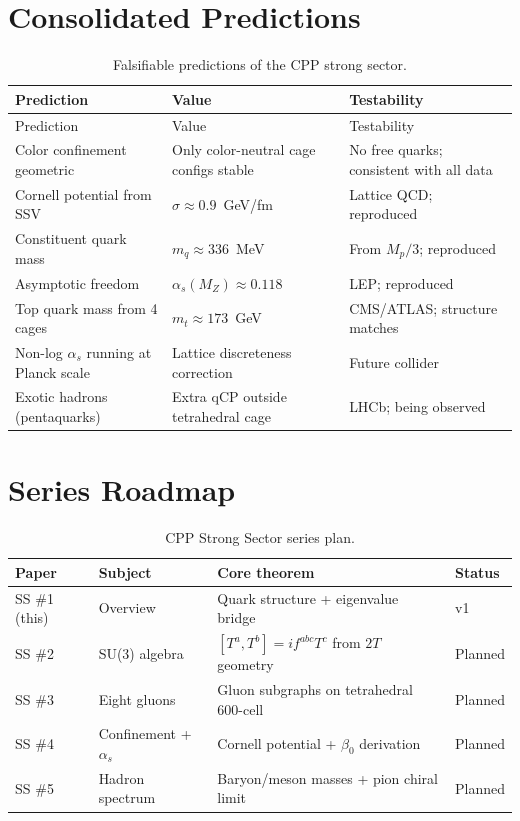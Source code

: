 \documentclass[11pt,a4paper]{article}
\newcommand{\as}{\alpha_s}
\begin{document}
\section{Consolidated Predictions}

\begin{longtable}{@{}p{4.5cm}p{4cm}p{4cm}@{}}
\caption{Falsifiable predictions of the CPP strong sector.}
\label{tab:predictions}\\
\toprule
Prediction & Value & Testability \\
\midrule
\endfirsthead
\toprule
Prediction & Value & Testability \\
\midrule
\endhead
\bottomrule
\endfoot
Color confinement geometric
  & Only color-neutral cage configs stable
  & No free quarks; consistent with all data \\[4pt]
Cornell potential from SSV
  & $\sigma \approx 0.9$~GeV/fm
  & Lattice QCD; reproduced \\[4pt]
Constituent quark mass
  & $m_q \approx 336$~MeV
  & From $M_p/3$; reproduced \\[4pt]
Asymptotic freedom
  & $\as(M_Z) \approx 0.118$
  & LEP; reproduced \\[4pt]
Top quark mass from 4 cages
  & $m_t \approx 173$~GeV
  & CMS/ATLAS; structure matches \\[4pt]
Non-log $\as$ running at Planck scale
  & Lattice discreteness correction
  & Future collider \\[4pt]
Exotic hadrons (pentaquarks)
  & Extra qCP outside tetrahedral cage
  & LHCb; being observed \\
\end{longtable}

\section{Series Roadmap}

\begin{table}[H]
\centering
\caption{CPP Strong Sector series plan.}
\label{tab:roadmap}
\begin{tabular}{@{}llll@{}}
\toprule
Paper & Subject & Core theorem & Status \\
\midrule
SS \#1 (this) & Overview & Quark structure + eigenvalue bridge
  & v1 \\
SS \#2 & SU(3) algebra & $[T^a,T^b]=if^{abc}T^c$ from $2T$
  geometry & Planned \\
SS \#3 & Eight gluons & Gluon subgraphs on tetrahedral 600-cell
  & Planned \\
SS \#4 & Confinement + $\as$ & Cornell potential + $\beta_0$
  derivation & Planned \\
SS \#5 & Hadron spectrum & Baryon/meson masses + pion chiral limit
  & Planned \\
\bottomrule
\end{tabular}
\end{table}
\end{document}
